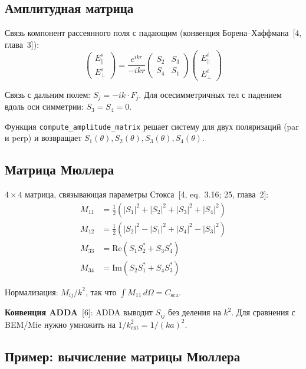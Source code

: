 \documentclass[12pt,a4paper]{article}
\begin{document}
\subsection{Амплитудная матрица}

Связь компонент рассеянного поля с падающим (конвенция Борена--Хаффмана~[4, глава~3]):
\begin{equation}
  \begin{pmatrix} E_\parallel^s \\ E_\perp^s \end{pmatrix}
  = \frac{e^{ikr}}{-ikr}
  \begin{pmatrix} S_2 & S_3 \\ S_4 & S_1 \end{pmatrix}
  \begin{pmatrix} E_\parallel^i \\ E_\perp^i \end{pmatrix}
\end{equation}

Связь с дальним полем: $S_j = -ik \cdot F_j$. Для осесимметричных тел с падением вдоль оси симметрии: $S_3 = S_4 = 0$.

Функция \texttt{compute\_amplitude\_matrix} решает систему для двух поляризаций (par и perp) и возвращает $S_1(\theta), S_2(\theta), S_3(\theta), S_4(\theta)$.

\subsection{Матрица Мюллера}

$4\times4$ матрица, связывающая параметры Стокса~[4, eq.~3.16; 25, глава~2]:
\begin{align}
  M_{11} &= \tfrac{1}{2}(|S_1|^2 + |S_2|^2 + |S_3|^2 + |S_4|^2) \\
  M_{12} &= \tfrac{1}{2}(|S_2|^2 - |S_1|^2 + |S_4|^2 - |S_3|^2) \\
  M_{33} &= \mathrm{Re}(S_1 S_2^* + S_3 S_4^*) \\
  M_{34} &= \mathrm{Im}(S_2 S_1^* + S_4 S_3^*)
\end{align}

Нормализация: $M_{ij} / k^2$, так что $\int M_{11} \, d\Omega = C_{\mathrm{sca}}$.

\textbf{Конвенция ADDA}~[6]: ADDA выводит $S_{ij}$ без деления на $k^2$. Для сравнения с BEM/Mie нужно умножить на $1/k_{\mathrm{ext}}^2 = 1/(ka)^2$.

\subsection{Пример: вычисление матрицы Мюллера}
\end{document}
